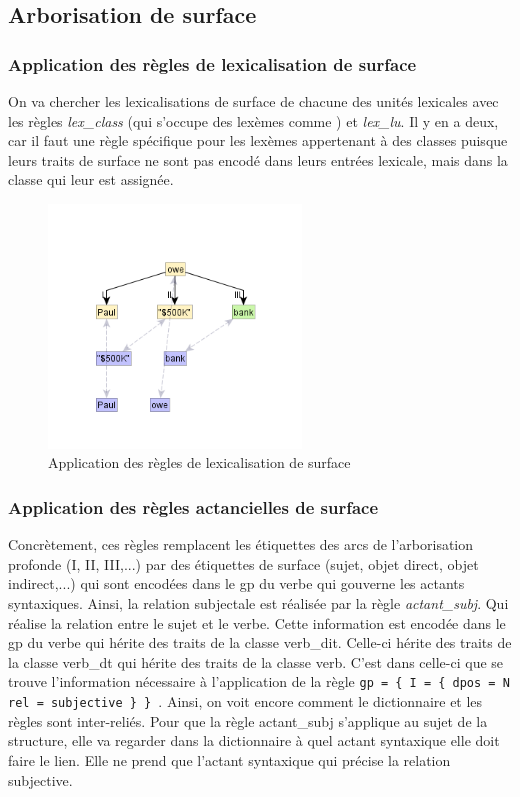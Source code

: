 
\subsection{Arborisation de surface}

\subsubsection{Application des règles de lexicalisation de surface}
On va chercher les lexicalisations de surface de chacune des unités lexicales avec les règles \emph{lex\_class} (qui s'occupe des lexèmes comme ) et \emph{lex\_lu}. Il y en a deux, car il faut une règle spécifique pour les lexèmes appertenant à des classes puisque leurs traits de surface ne sont pas encodé dans leurs entrées lexicale, mais dans la classe qui leur est assignée.

\begin{figure}[htb]
	\centering
	\includegraphics[width=0.6\textwidth, trim = {0cm 13mm 0cm 2cm},clip]{ch3/figs/rsyntslexicalisation1.png}
	\caption{Application des règles de lexicalisation de surface}
	\label{fig:lexsurf}
\end{figure}

\subsubsection{Application des règles actancielles de surface}
Concrètement, ces règles remplacent les étiquettes des arcs de l'arborisation profonde (I, II, III,...) par des étiquettes de surface (sujet, objet direct, objet indirect,...) qui sont encodées dans le \ac{gp} du verbe qui gouverne les actants syntaxiques. Ainsi, la relation subjectale est réalisée par la règle \emph{actant\_subj}. Qui réalise la relation entre le sujet et le verbe. Cette information est encodée dans le gp du verbe  qui hérite des traits de la classe verb\_dit. Celle-ci hérite des traits de la classe verb\_dt qui hérite des traits de la classe verb. C'est dans celle-ci que se trouve l'information nécessaire à l'application de la règle \lstinline!gp = { I = { dpos = N rel = subjective } } !. Ainsi, on voit encore comment le dictionnaire et les règles sont inter-reliés. Pour que la règle actant\_subj s'applique au sujet de la structure, elle va regarder dans la dictionnaire à quel actant syntaxique elle doit faire le lien. Elle ne prend que l'actant syntaxique qui précise la relation subjective.


